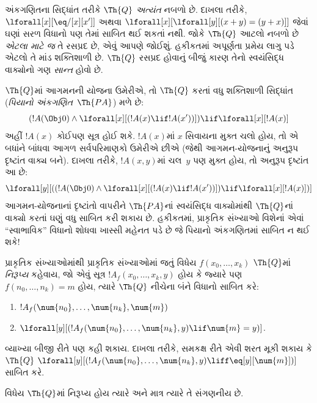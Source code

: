 અંકગણિતના સિદ્ધાંત તરીકે
$\Th{Q}$ \emph{અત્યંત} નબળો છે.
દાખલા તરીકે,
$\lforall[x][\eq/[x][x']]$ અથવા
$\lforall[x][\lforall[y][(x + y) = (y +
    x)]]$ જેવાં ઘણાં સરળ વિધાનો પણ
તેમાં સાબિત થઈ શકતાં નથી. જોકે
$\Th{Q}$ આટલો નબળો છે \emph{એટલા
માટે જ} તે રસપ્રદ છે, એવું આપણે
જોઈશું. હકીકતમાં અપૂર્ણતા પ્રમેય
લાગુ પડે એટલો તે માંડ શક્તિશાળી છે.
$\Th{Q}$ રસપ્રદ હોવાનું બીજું કારણ
તેનો સ્વયંસિદ્ધ વાક્યોનો ગણ
\emph{સાન્ત} હોવો છે.

$\Th{Q}$માં આગમનની યોજના ઉમેરીએ,
તો $\Th{Q}$ કરતાં વધુ શક્તિશાળી સિદ્ધાંત
(\emph{પિયાનો અંકગણિત}~$\Th{PA}$)
મળે છે:
\[
(!A(\Obj 0) \land \lforall[x][(!A(x) \lif !A(x'))]) \lif \lforall[x][!A(x)]
\]
અહીં $!A(x)$ કોઈપણ સૂત્ર હોઈ શકે.
$!A(x)$માં $x$ સિવાયના મુક્ત
ચલો હોય, તો એ બધાંને બાંધવા
આગળ સર્વપરિમાણકો ઉમેરીએ છીએ
(જેથી આગમન-યોજનાનું અનુરૂપ દૃષ્ટાંત
વાક્ય બને). દાખલા તરીકે,
$!A(x, y)$માં ચલ~$y$
પણ મુક્ત હોય, તો અનુરૂપ દૃષ્ટાંત આ છે:
\[
\lforall[y][((!A(\Obj 0) \land \lforall[x][(!A(x) \lif !A(x'))]) \lif
  \lforall[x][!A(x)])]
\]
આગમન-યોજનાનાં દૃષ્ટાંતો વાપરીને
$\Th{PA}$નાં સ્વયંસિદ્ધ વાક્યોમાંથી
$\Th{Q}$નાં વાક્યો કરતાં ઘણું વધુ
સાબિત કરી શકાય છે. હકીકતમાં,
પ્રાકૃતિક સંખ્યાઓ વિશેનાં એવાં
``સ્વાભાવિક'' વિધાનો શોધવા ખાસ્સી
મહેનત પડે છે જે પિયાનો અંકગણિતમાં
સાબિત ન થઈ શકે!{}

\begin{defn}
  પ્રાકૃતિક સંખ્યાઓમાંથી પ્રાકૃતિક
  સંખ્યાઓમાં જતું વિધેય
  $f(x_0,\ldots,x_k)$
  {$\Th{Q}$માં \emph{નિરૂપ્ય}}
  કહેવાય, જો એવું સૂત્ર
  $!A_f(x_0,\dots,x_k,y)$ હોય કે
  જ્યારે પણ $f(n_0,\dots,n_k) = m$
  હોય, ત્યારે $\Th{Q}$ નીચેના
  બંને વિધાનો સાબિત કરે:
\begin{enumerate}
\item{} $!A_f(\num{n_0}, \dots, \num{n_k}, \num{m})$
\item{} $\lforall[y][(!A_f(\num{n_0}, \dots,
\num{n_k}, y) \lif \num{m} = y)]$.
\end{enumerate}
\end{defn}

વ્યાખ્યા બીજી રીતે પણ કહી શકાય.
દાખલા તરીકે, સમકક્ષ રીતે એવી
શરત મૂકી શકાય કે $\Th{Q}$
$\lforall[y][(!A_f(\num{n_0}, \dots,
\num{n_k}, y) \liff \eq[y][\num{m}])]$
સાબિત કરે.

\begin{thm}
વિધેય $\Th{Q}$માં નિરૂપ્ય હોય ત્યારે
અને માત્ર ત્યારે તે સંગણનીય છે.
\end{thm}

